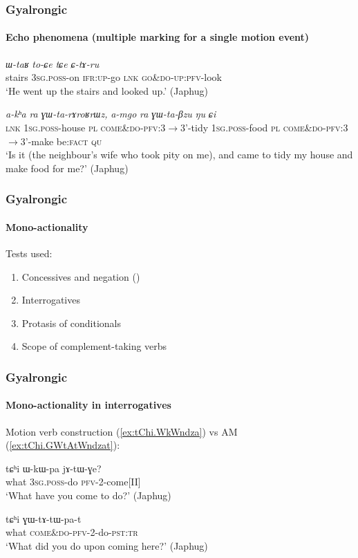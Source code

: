 \documentclass[xcolor=table]{beamer}
\newcommand{\bleu}[1]{{\color{blue}#1}}
\newcommand{\rouge}[1]{{\color{red}#1}}
\newcommand{\ipa}[1]{{\phon\textit{#1}}}
\begin{document}
\begin{frame} 
\frametitle{Gyalrongic}
 \framesubtitle{Echo phenomena (multiple marking for a single motion event)}

\begin{exe}
\ex \label{ex:CtAru}
\gll \ipa{tɕʰi} \ipa{ɯ-taʁ} \ipa{to-\rouge{ɕe}} \ipa{tɕe} \ipa{\rouge{ɕ}-tɤ-ru}   \\
stairs \textsc{3sg}.\textsc{poss}-on \textsc{ifr}:\textsc{up}-\rouge{go} \textsc{lnk}  \rouge{\textsc{go\&do}}-\textsc{up}:\textsc{pfv}-look \\
\glt `He \rouge{went} up the stairs and looked up.' (Japhug)
\end{exe}
\begin{exe}
\ex \label{ex:GWtaBzu}
\gll  \ipa{tɕe} 	\ipa{a-kʰa} 	\ipa{ra} 	\ipa{\rouge{ɣɯ}-ta-rɤroʁrɯz,} 	\ipa{a-mgo} 	\ipa{ra} 	\ipa{\rouge{ɣɯ}-ta-βzu} 	\ipa{ŋu} 	\ipa{ɕi} 
\\
\textsc{lnk} \textsc{1sg}.\textsc{poss}-house \textsc{pl} \rouge{\textsc{come\&do}}-\textsc{pfv}:3$\rightarrow$3'-tidy 
 \textsc{1sg}.\textsc{poss}-food \textsc{pl} \rouge{\textsc{come\&do}}-\textsc{pfv}:3$\rightarrow$3'-make be:\textsc{fact} \textsc{qu} \\ 
\glt `Is it (the neighbour's wife who took pity on me), and \rouge{came} to tidy my house and make food for me?' (Japhug)
\end{exe}
 \end{frame}   
 
 \begin{frame} 
\frametitle{Gyalrongic}
 \framesubtitle{Mono-actionality}
 Tests used:
\begin{enumerate}
\item Concessives and negation (\citealt{jacques13harmonization})
\item Interrogatives
\item Protasis of conditionals
\item Scope of complement-taking verbs
 \end{enumerate}
 \end{frame}  
 
  \begin{frame} 
\frametitle{Gyalrongic}
 \framesubtitle{Mono-actionality in interrogatives}
 Motion verb construction (\ref{ex:tChi.WkWndza}) vs AM (\ref{ex:tChi.GWtAtWndzat}):
\begin{exe}
\ex \label{ex:tChi.WkWndza}
\gll tɕʰi ɯ-kɯ-pa jɤ-tɯ-\bleu{ɣe}? \\
what \textsc{3sg.poss}-do \textsc{pfv}-2-\bleu{come[II]} \\
\glt `What have you \bleu{come} to do?' (Japhug)
\end{exe}

\begin{exe}
\ex \label{ex:tChi.GWtAtWndzat}
\gll tɕʰi \rouge{ɣɯ}-tɤ-tɯ-pa-t \\
what \rouge{\textsc{come\&do}}-\textsc{pfv}-2-do-\textsc{pst:tr}    \\
\glt `What did you do upon \rouge{coming} here?' (Japhug)
\end{exe} 
  \end{frame}  
\end{document}
